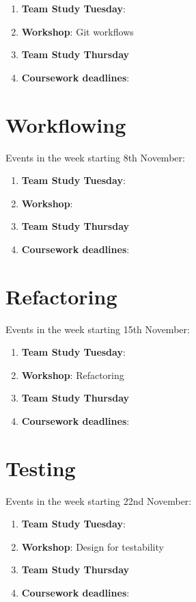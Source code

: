 \documentclass[
]{book}
\providecommand{\tightlist}{%
  \setlength{\itemsep}{0pt}\setlength{\parskip}{0pt}}
\begin{document}
\begin{enumerate}
\def\labelenumi{\arabic{enumi}.}
\tightlist
\item
  \textbf{Team Study Tuesday}:
\item
  \textbf{Workshop}: Git workflows
\item
  \textbf{Team Study Thursday}
\item
  \textbf{Coursework deadlines}:
\end{enumerate}

\hypertarget{week7}{%
\section{Workflowing}\label{week7}}

Events in the week starting 8th November:

\begin{enumerate}
\def\labelenumi{\arabic{enumi}.}
\tightlist
\item
  \textbf{Team Study Tuesday}:
\item
  \textbf{Workshop}:
\item
  \textbf{Team Study Thursday}
\item
  \textbf{Coursework deadlines}:
\end{enumerate}

\hypertarget{week8}{%
\section{Refactoring}\label{week8}}

Events in the week starting 15th November:

\begin{enumerate}
\def\labelenumi{\arabic{enumi}.}
\tightlist
\item
  \textbf{Team Study Tuesday}:
\item
  \textbf{Workshop}: Refactoring
\item
  \textbf{Team Study Thursday}
\item
  \textbf{Coursework deadlines}:
\end{enumerate}

\hypertarget{week9}{%
\section{Testing}\label{week9}}

Events in the week starting 22nd November:

\begin{enumerate}
\def\labelenumi{\arabic{enumi}.}
\tightlist
\item
  \textbf{Team Study Tuesday}:
\item
  \textbf{Workshop}: Design for testability
\item
  \textbf{Team Study Thursday}
\item
  \textbf{Coursework deadlines}:
\end{enumerate}
\end{document}
